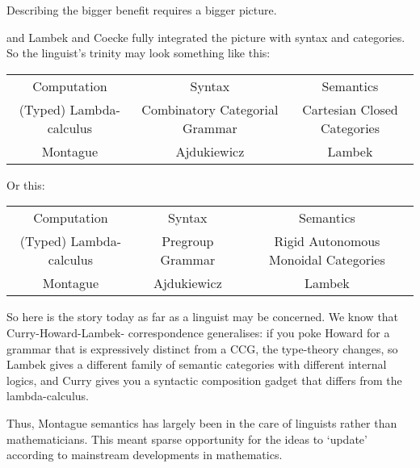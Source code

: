 Describing the bigger benefit requires a bigger picture. 


and Lambek and Coecke fully integrated the picture with syntax and categories. So the linguist's trinity may look something like this:

\begin{table}[]
\begin{tabular}{ccc}
Computation & Syntax & Semantics \\
(Typed) Lambda-calculus & Combinatory Categorial Grammar & Cartesian Closed Categories \\
Montague & Ajdukiewicz & Lambek
\end{tabular}
\end{table}

Or this:

\begin{table}[]
\begin{tabular}{ccc}
Computation & Syntax & Semantics \\
(Typed) Lambda-calculus & Pregroup Grammar & Rigid Autonomous Monoidal Categories \\
Montague & Ajdukiewicz & Lambek
\end{tabular}
\end{table}

So here is the story today as far as a linguist may be concerned. We know that Curry-Howard-Lambek- correspondence generalises: if you poke Howard for a grammar that is expressively distinct from a CCG, the type-theory changes, so Lambek gives a different family of semantic categories with different internal logics, and Curry gives you a syntactic composition gadget that differs from the lambda-calculus.


 Thus, Montague semantics has largely been in the care of linguists rather than mathematicians. This meant sparse opportunity for the ideas to `update' according to mainstream developments in mathematics.\\

